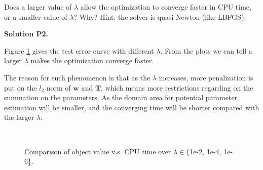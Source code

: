 \documentclass[11pt]{report}
\begin{document}
Does a larger value of $\lambda$ allow the optimization to converge faster in CPU time,
or a smaller value of $\lambda$?  Why?
Hint: the solver is quasi-Newton (like LBFGS).

{\bf Solution P2.}

Figure \ref{fig:compare_cpuTime} gives the test error curve with different $\lambda$. From the plots we can tell a larger $\lambda$ makes the optimization converge faster. 

The reason for such phenomenon is that as the $\lambda$ increases, more penalization is put on the $l_2$ norm of $\boldsymbol{w}$ and $\boldsymbol{T}$, which means more restrictions regarding on the summation on the parameters. As the domain area for potential parameter estimation will be smaller, and the converging time will be shorter compared with the larger $\lambda$. 

\begin{figure}[t]
\centering
{}
~~
~~
\caption{Comparison of object value v.s. CPU time over $\lambda \in \{${\sf 1e-2, 1e-4, 1e-6}\}.}
\label{fig:compare_cpuTime}
\end{figure}
\end{document}
